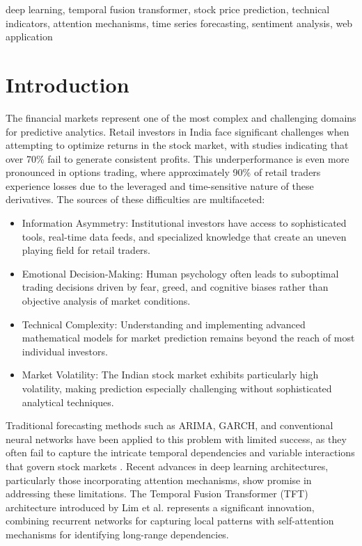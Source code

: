 \documentclass[conference]{IEEEtran}
\begin{document}
\begin{IEEEkeywords}
deep learning, temporal fusion transformer, stock price prediction, technical indicators, attention mechanisms, time series forecasting, sentiment analysis, web application
\end{IEEEkeywords}

\section{Introduction}
The financial markets represent one of the most complex and challenging domains for predictive analytics. Retail investors in India face significant challenges when attempting to optimize returns in the stock market, with studies indicating that over 70\% fail to generate consistent profits. This underperformance is even more pronounced in options trading, where approximately 90\% of retail traders experience losses due to the leveraged and time-sensitive nature of these derivatives. The sources of these difficulties are multifaceted:

\begin{itemize}
\item Information Asymmetry: Institutional investors have access to sophisticated tools, real-time data feeds, and specialized knowledge that create an uneven playing field for retail traders.

\item Emotional Decision-Making: Human psychology often leads to suboptimal trading decisions driven by fear, greed, and cognitive biases rather than objective analysis of market conditions.

\item Technical Complexity: Understanding and implementing advanced mathematical models for market prediction remains beyond the reach of most individual investors.

\item Market Volatility: The Indian stock market exhibits particularly high volatility, making prediction especially challenging without sophisticated analytical techniques.
\end{itemize}

Traditional forecasting methods such as ARIMA, GARCH, and conventional neural networks have been applied to this problem with limited success, as they often fail to capture the intricate temporal dependencies and variable interactions that govern stock markets \cite{bao2017deep}. Recent advances in deep learning architectures, particularly those incorporating attention mechanisms, show promise in addressing these limitations. The Temporal Fusion Transformer (TFT) architecture introduced by Lim et al. \cite{lim2021temporal} represents a significant innovation, combining recurrent networks for capturing local patterns with self-attention mechanisms for identifying long-range dependencies.
\end{document}

